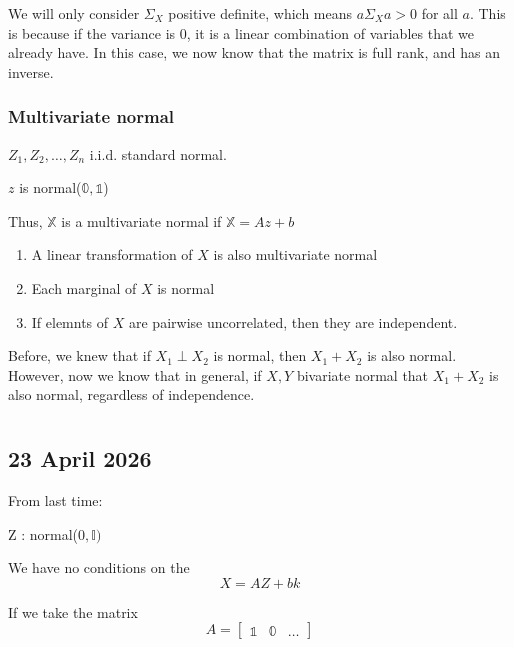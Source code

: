 \documentclass{report}
\begin{document}
We will only consider $\Sigma_{X}$ positive definite, which means $a \Sigma_{X}a >0$ for all $a$. This is because if the variance is 0, it is a linear combination of variables that we already have. In this case, we now know that the matrix is full rank, and has an inverse. 


\subsection{Multivariate normal}
$Z_1, Z_2, \dots, Z_{n}$ i.i.d. standard normal. 

$z$  is normal($\mathbb{0}, \mathbb{1}$) 


Thus, $\mathbb{X}$ is a multivariate normal if $\mathbb{X} = Az + b$ 



\begin{enumerate}
	\item A linear transformation of $X$ is also multivariate normal
	\item Each marginal of $X$  is normal 
	\item If elemnts of $X$  are pairwise uncorrelated, then they are independent. 
\end{enumerate}
Before, we knew that if $X_1 \perp X_2$ is normal, then $X_1 + X_2$ is also normal. However, now we know that in general, if $X,Y$ bivariate normal that $X_1 + X_2 $ is also normal, regardless of independence. 



\chapter{}
\section{23 April 2026}
From last time: 

Z : normal($0, \mathbb{I})$ 


We have no conditions on the 
\[
X = AZ + bk
\]

If we take the matrix 
\[ A = 
\begin{bmatrix}
	\mathbb{1} &\mathbb{0} &\dots	
\end{bmatrix}
\]
\end{document}
